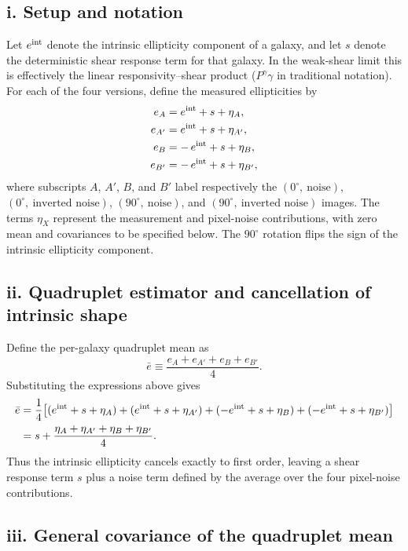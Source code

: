 \documentclass[11pt]{EuclidVIS}
\numberwithin{table}{section}
\numberwithin{figure}{section}
\begin{document}
\subsection*{i. Setup and notation}

Let $e^{\rm int}$ denote the intrinsic ellipticity component of a galaxy,
and let $s$ denote the deterministic shear response term for that galaxy.
In the weak-shear limit this is effectively the linear responsivity--shear
product ($P^\gamma\gamma$ in traditional notation).
For each of the four versions, define the measured ellipticities by
\begin{align}
e_A &= e^{\rm int} + s + \eta_A, \\
e_{A'} &= e^{\rm int} + s + \eta_{A'}, \\
e_B &= -\,e^{\rm int} + s + \eta_B, \\
e_{B'} &= -\,e^{\rm int} + s + \eta_{B'},
\end{align}
where subscripts $A$, $A'$, $B$, and $B'$ label respectively
the $(0^\circ,\ \text{noise})$, $(0^\circ,\ \text{inverted noise})$,
$(90^\circ,\ \text{noise})$, and $(90^\circ,\ \text{inverted noise})$
images.  
The terms $\eta_X$ represent the measurement and pixel-noise contributions,
with zero mean and covariances to be specified below.
The $90^\circ$ rotation flips the sign of the intrinsic ellipticity component.

\subsection*{ii. Quadruplet estimator and cancellation of intrinsic shape}

Define the per-galaxy quadruplet mean as
\begin{equation}
\bar e \equiv \frac{e_A + e_{A'} + e_B + e_{B'}}{4}.
\end{equation}
Substituting the expressions above gives
\begin{align}
\bar e
&= \frac{1}{4}
   \big[(e^{\rm int}+s+\eta_A)
      + (e^{\rm int}+s+\eta_{A'})
      + (-e^{\rm int}+s+\eta_B)
      + (-e^{\rm int}+s+\eta_{B'})\big] \\
&= s + \frac{\eta_A + \eta_{A'} + \eta_B + \eta_{B'}}{4}.
\end{align}
Thus the intrinsic ellipticity cancels exactly to first order, leaving a
shear response term $s$ plus a noise term defined by the average over the
four pixel-noise contributions.

\subsection*{iii. General covariance of the quadruplet mean}
\end{document}
